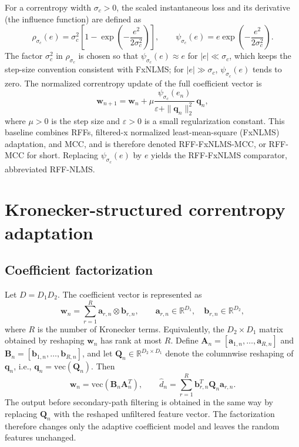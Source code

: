 \documentclass[preprint,12pt]{elsarticle}
\begin{document}
For a correntropy width $\sigma_c > 0$, the scaled instantaneous loss and its derivative (the influence function) are defined as
\begin{equation}\label{eq:mcc}
\rho_{\sigma_c}(e) = \sigma_c^2 \left[ 1 - \exp\!\left( -\frac{e^2}{2\sigma_c^2} \right) \right], \qquad
\psi_{\sigma_c}(e) = e \exp\!\left( -\frac{e^2}{2\sigma_c^2} \right).
\end{equation}
The factor $\sigma_c^2$ in $\rho_{\sigma_c}$ is chosen so that $\psi_{\sigma_c}(e) \approx e$ for $|e| \ll \sigma_c$, which keeps the step-size convention consistent with FxNLMS; for $|e| \gg \sigma_c$, $\psi_{\sigma_c}(e)$ tends to zero. The normalized correntropy update of the full coefficient vector is
\begin{equation}\label{eq:fullupd}
\mathbf{w}_{n+1} = \mathbf{w}_n + \mu \frac{\psi_{\sigma_c}(e_n)}{\varepsilon + \|\mathbf{q}_n\|_2^2}\, \mathbf{q}_n ,
\end{equation}
where $\mu > 0$ is the step size and $\varepsilon > 0$ is a small regularization constant. This baseline combines RFFs, filtered-x normalized least-mean-square (FxNLMS) adaptation, and MCC, and is therefore denoted RFF-FxNLMS-MCC, or RFF-MCC for short. Replacing $\psi_{\sigma_c}(e)$ by $e$ yields the RFF-FxNLMS comparator, abbreviated RFF-NLMS.

\section{Kronecker-structured correntropy adaptation}\label{sec:method}

\subsection{Coefficient factorization}

Let $D = D_1 D_2$. The coefficient vector is represented as
\begin{equation}\label{eq:kron}
\mathbf{w}_n = \sum_{r=1}^{R} \mathbf{a}_{r,n} \otimes \mathbf{b}_{r,n}, \qquad \mathbf{a}_{r,n} \in \mathbb{R}^{D_1}, \quad \mathbf{b}_{r,n} \in \mathbb{R}^{D_2},
\end{equation}
where $R$ is the number of Kronecker terms. Equivalently, the $D_2 \times D_1$ matrix obtained by reshaping $\mathbf{w}_n$ has rank at most $R$. Define $\mathbf{A}_n = [\mathbf{a}_{1,n}, \ldots, \mathbf{a}_{R,n}]$ and $\mathbf{B}_n = [\mathbf{b}_{1,n}, \ldots, \mathbf{b}_{R,n}]$, and let $\mathbf{Q}_n \in \mathbb{R}^{D_2 \times D_1}$ denote the columnwise reshaping of $\mathbf{q}_n$, i.e., $\mathbf{q}_n = \mathrm{vec}(\mathbf{Q}_n)$. Then
\begin{equation}\label{eq:vec}
\mathbf{w}_n = \mathrm{vec}(\mathbf{B}_n \mathbf{A}_n^T), \qquad
\widehat{d}_n = \sum_{r=1}^{R} \mathbf{b}_{r,n}^T \mathbf{Q}_n \mathbf{a}_{r,n}.
\end{equation}
The output before secondary-path filtering is obtained in the same way by replacing $\mathbf{Q}_n$ with the reshaped unfiltered feature vector. The factorization therefore changes only the adaptive coefficient model and leaves the random features unchanged.
\end{document}

